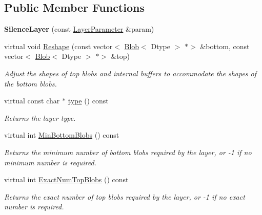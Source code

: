 \subsection*{Public Member Functions}
\begin{DoxyCompactItemize}
\item 
\mbox{\label{classcaffe_1_1_silence_layer_a78a184081ba10fef4d0e639eab86122b}} 
{\bfseries Silence\+Layer} (const \mbox{\hyperlink{classcaffe_1_1_layer_parameter}{Layer\+Parameter}} \&param)
\item 
virtual void \mbox{\hyperlink{classcaffe_1_1_silence_layer_a96a47a49a103e60a681f97eff7bf42f2}{Reshape}} (const vector$<$ \mbox{\hyperlink{classcaffe_1_1_blob}{Blob}}$<$ Dtype $>$ $\ast$$>$ \&bottom, const vector$<$ \mbox{\hyperlink{classcaffe_1_1_blob}{Blob}}$<$ Dtype $>$ $\ast$$>$ \&top)
\begin{DoxyCompactList}\small\item\em Adjust the shapes of top blobs and internal buffers to accommodate the shapes of the bottom blobs. \end{DoxyCompactList}\item 
\mbox{\label{classcaffe_1_1_silence_layer_a15c82cb3f0f3da19c07cc9878aa8d6cf}} 
virtual const char $\ast$ \mbox{\hyperlink{classcaffe_1_1_silence_layer_a15c82cb3f0f3da19c07cc9878aa8d6cf}{type}} () const
\begin{DoxyCompactList}\small\item\em Returns the layer type. \end{DoxyCompactList}\item 
virtual int \mbox{\hyperlink{classcaffe_1_1_silence_layer_af916fa4138f5d8761ec4490588eeccd1}{Min\+Bottom\+Blobs}} () const
\begin{DoxyCompactList}\small\item\em Returns the minimum number of bottom blobs required by the layer, or -\/1 if no minimum number is required. \end{DoxyCompactList}\item 
virtual int \mbox{\hyperlink{classcaffe_1_1_silence_layer_a1e072cbda98dbc57001ce92432b045b8}{Exact\+Num\+Top\+Blobs}} () const
\begin{DoxyCompactList}\small\item\em Returns the exact number of top blobs required by the layer, or -\/1 if no exact number is required. \end{DoxyCompactList}\item 

\end{DoxyCompactItemize}
